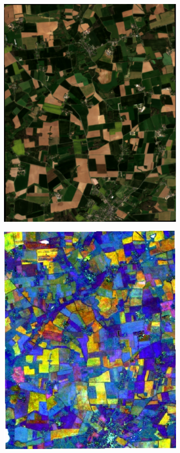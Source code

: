 \documentclass[journal,article,submit,pdftex,moreauthors]{Definitions/mdpi}
\begin{document}
\begin{figure}[H]
	\centering
	\begin{subfigure}[t]{0.23\linewidth}
		\centering
	\includegraphics[height=\linewidth,width=0.95\linewidth]{figures/reconstruction_errors/test_aoi_RGB.pdf}
	\caption{}
	\label{fig:gee_img_a}
	\end{subfigure}
	\begin{subfigure}[t]{0.23\linewidth}
		\centering
    \includegraphics[height=\linewidth,width=0.95\linewidth]{figures/aes_1_layer_mse_results/composites/composite_image_1.pdf}

\end{subfigure}
\end{figure}
\end{document}
